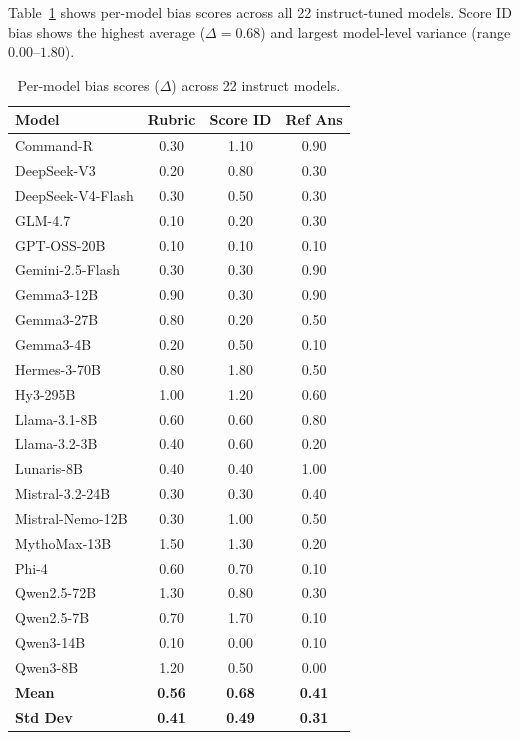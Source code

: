 \documentclass[11pt,preprint,nonatbib]{article}
\begin{document}
Table~\ref{tab:per_model} shows per-model bias scores across all 22 instruct-tuned models. Score ID bias shows the highest average ($\Delta = 0.68$) and largest model-level variance (range $0.00$--$1.80$).

\begin{table}[h]
\centering\small
\caption{Per-model bias scores ($\Delta$) across 22 instruct models.}
\label{tab:per_model}
\begin{tabular}{lccc}
\toprule
\textbf{Model} & \textbf{Rubric} & \textbf{Score ID} & \textbf{Ref Ans} \\
\midrule
Command-R & 0.30 & 1.10 & 0.90 \\
DeepSeek-V3 & 0.20 & 0.80 & 0.30 \\
DeepSeek-V4-Flash & 0.30 & 0.50 & 0.30 \\
GLM-4.7 & 0.10 & 0.20 & 0.30 \\
GPT-OSS-20B & 0.10 & 0.10 & 0.10 \\
Gemini-2.5-Flash & 0.30 & 0.30 & 0.90 \\
Gemma3-12B & 0.90 & 0.30 & 0.90 \\
Gemma3-27B & 0.80 & 0.20 & 0.50 \\
Gemma3-4B & 0.20 & 0.50 & 0.10 \\
Hermes-3-70B & 0.80 & 1.80 & 0.50 \\
Hy3-295B & 1.00 & 1.20 & 0.60 \\
Llama-3.1-8B & 0.60 & 0.60 & 0.80 \\
Llama-3.2-3B & 0.40 & 0.60 & 0.20 \\
Lunaris-8B & 0.40 & 0.40 & 1.00 \\
Mistral-3.2-24B & 0.30 & 0.30 & 0.40 \\
Mistral-Nemo-12B & 0.30 & 1.00 & 0.50 \\
MythoMax-13B & 1.50 & 1.30 & 0.20 \\
Phi-4 & 0.60 & 0.70 & 0.10 \\
Qwen2.5-72B & 1.30 & 0.80 & 0.30 \\
Qwen2.5-7B & 0.70 & 1.70 & 0.10 \\
Qwen3-14B & 0.10 & 0.00 & 0.10 \\
Qwen3-8B & 1.20 & 0.50 & 0.00 \\
\midrule
\textbf{Mean} & \textbf{0.56} & \textbf{0.68} & \textbf{0.41} \\
\textbf{Std Dev} & \textbf{0.41} & \textbf{0.49} & \textbf{0.31} \\
\bottomrule
\end{tabular}
\end{table}
\end{document}
